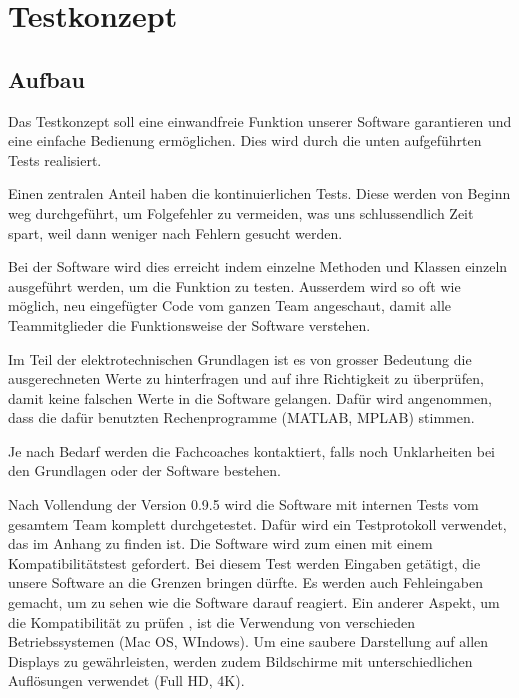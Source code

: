 \section{Testkonzept}\label{sec:testkonzept}

\subsection{Aufbau} \label{subsec:prinzip}

Das Testkonzept soll eine einwandfreie Funktion unserer Software garantieren und eine einfache Bedienung ermöglichen. Dies wird durch die unten aufgeführten Tests realisiert.
 
Einen zentralen Anteil haben die kontinuierlichen Tests. Diese werden von Beginn weg durchgeführt, um Folgefehler zu vermeiden, was uns schlussendlich Zeit spart, weil dann weniger nach Fehlern gesucht werden.  

Bei der Software wird dies erreicht indem einzelne Methoden und Klassen einzeln ausgeführt werden, um die Funktion zu testen. Ausserdem wird so oft wie möglich, neu eingefügter Code vom ganzen Team angeschaut, damit alle Teammitglieder die Funktionsweise der Software verstehen.

Im Teil der elektrotechnischen Grundlagen ist es von grosser Bedeutung die ausgerechneten Werte zu hinterfragen und auf ihre Richtigkeit zu überprüfen, damit keine falschen Werte in die Software gelangen. Dafür wird angenommen, dass die dafür benutzten Rechenprogramme (MATLAB, MPLAB) stimmen. 

Je nach Bedarf werden die Fachcoaches kontaktiert, falls noch Unklarheiten bei den Grundlagen oder der Software bestehen. 

Nach Vollendung der Version 0.9.5 wird die Software mit internen Tests vom gesamtem Team komplett durchgetestet. Dafür wird ein Testprotokoll verwendet, das  im Anhang zu finden ist.  
Die Software wird zum einen mit einem Kompatibilitätstest gefordert. Bei diesem Test werden Eingaben getätigt, die unsere Software an die Grenzen bringen dürfte. Es werden auch Fehleingaben gemacht, um zu sehen wie die Software darauf reagiert. Ein anderer Aspekt, um die Kompatibilität zu prüfen , ist die Verwendung von verschieden Betriebssystemen (Mac OS, WIndows). Um eine saubere Darstellung auf allen Displays zu gewährleisten, werden zudem Bildschirme mit unterschiedlichen Auflösungen verwendet (Full HD, 4K).

